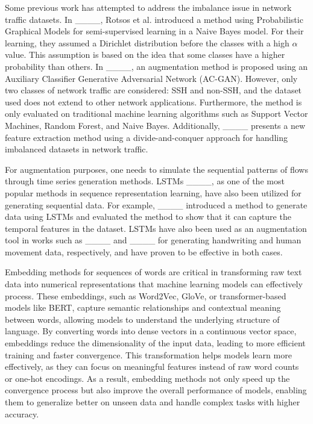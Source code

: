 Some previous work has attempted to address the imbalance issue in network traffic datasets. In ____, Rotsos et al. introduced a method using Probabilistic Graphical Models for semi-supervised learning in a Naive Bayes model. For their learning, they assumed a Dirichlet distribution before the classes with a high $\alpha$ value. This assumption is based on the idea that some classes have a higher probability than others. In ____, an augmentation method is proposed using an Auxiliary Classifier Generative Adversarial Network (AC-GAN). However, only two classes of network traffic are considered: SSH and non-SSH, and the dataset used does not extend to other network applications. Furthermore, the method is only evaluated on traditional machine learning algorithms such as Support Vector Machines, Random Forest, and Naive Bayes. Additionally, ____ presents a new feature extraction method using a divide-and-conquer approach for handling imbalanced datasets in network traffic.

For augmentation purposes, one needs to simulate the sequential patterns of flows through time series generation methods. LSTMs ____, as one of the most popular methods in sequence representation learning, have also been utilized for generating sequential data. For example, ____ introduced a method to generate data using LSTMs and evaluated the method to show that it can capture the temporal features in the dataset. LSTMs have also been used as an augmentation tool in works such as ____ and ____ for generating handwriting and human movement data, respectively, and have proven to be effective in both cases.

Embedding methods for sequences of words are critical in transforming raw text data into numerical representations that machine learning models can effectively process. These embeddings, such as Word2Vec, GloVe, or transformer-based models like BERT, capture semantic relationships and contextual meaning between words, allowing models to understand the underlying structure of language. By converting words into dense vectors in a continuous vector space, embeddings reduce the dimensionality of the input data, leading to more efficient training and faster convergence. This transformation helps models learn more effectively, as they can focus on meaningful features instead of raw word counts or one-hot encodings. As a result, embedding methods not only speed up the convergence process but also improve the overall performance of models, enabling them to generalize better on unseen data and handle complex tasks with higher accuracy.

